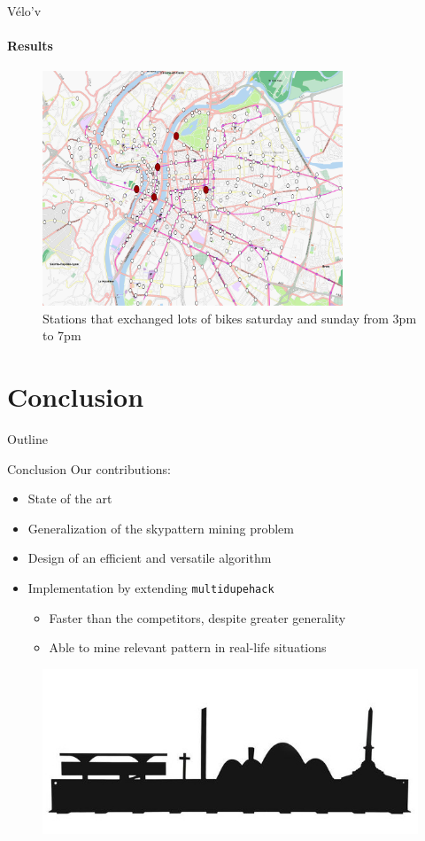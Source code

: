 \documentclass{beamer}
\newcommand{\mdh}{\texttt{multi\-dupe\-hack}}
\begin{document}
\begin{frame}{Vélo'v}
  \framesubtitle{Results}
  \begin{figure}[htp]
  \centering
  \includegraphics[width=0.8\textwidth]{pattern-weekend.png}
  \caption{Stations that exchanged lots of bikes saturday and sunday from 3pm to 7pm}
  \end{figure}
\end{frame}


\section{Conclusion}
\begin{frame}{Outline}
  \tableofcontents[currentsection]
\end{frame}

\begin{frame}{Conclusion}
  Our contributions:
  \begin{itemize}
  \item State of the art
  \item Generalization of the skypattern mining problem
  \item Design of an efficient and versatile algorithm
  \item Implementation by extending \mdh{}
    \begin{itemize}
    \item Faster than the competitors, despite greater generality
    \item Able to mine relevant pattern in real-life situations
    \end{itemize}
  \end{itemize}
\end{frame}

\begin{frame}{}
  \begin{figure}[htp]
    \centering
    \includegraphics[width=\textwidth]{bh-skyline.jpg}
  \end{figure} 
\end{frame}



\end{document}
